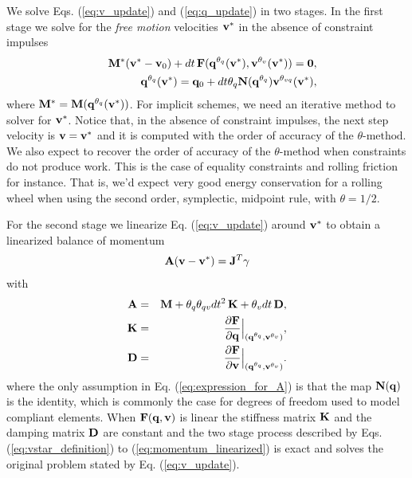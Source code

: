 We solve Eqs. (\ref{eq:v_update}) and (\ref{eq:q_update}) in two stages. In the
first stage we solve for the \textit{free motion} velocities ${\mathbf{v}}^*$ in the
absence of constraint impulses 
\begin{eqnarray}
	&&\mf{M}^*(\mf{v}^*-\mf{v}_0) + dt\,\mf{F}(\mf{q}^{\theta_q}(\mf{v}^*), \mf{v}^{\theta_v}(\mf{v}^*)) = \mf{0},
	\label{eq:vstar_definition}\\
	&&\mf{q}^{\theta_q}(\mf{v}^*) = \mf{q}_0 + dt\theta_q\mf{N}(\mf{q}^{\theta_{q}})\mf{v}^{\theta_{vq}}(\mf{v}^*),
	\label{eq:qstar_definition}
\end{eqnarray}
where ${\mathbf{M}}^* = {\mathbf{M}}({\mathbf{q}}^{\theta_q}({\mathbf{v}}^*))$.
For implicit schemes,
we need an iterative method to solver for ${\mathbf{v}}^*$. Notice that, in the
absence of constraint impulses, the next step velocity is ${\mathbf{v}}={\mathbf{v}}^*$ and
it is computed with the order of accuracy of the $\theta\text{-method}$. We also
expect to recover the order of accuracy of the $\theta\text{-method}$ when
constraints do not produce work.
This is the case of equality constraints and
rolling friction for instance. That is, we'd expect very good energy
conservation for a rolling wheel when using the second order, symplectic,
midpoint rule, with $\theta=1/2$.

For the second stage we linearize Eq. (\ref{eq:v_update})
around ${\mathbf{v}}^*$ to obtain a linearized balance of momentum
\begin{eqnarray}
	\mf{A}(\mf{v}-\mf{v}^*)= \mf{J}^T\mf{\gamma}
	\label{eq:momentum_linearized}
\end{eqnarray}
with
\begin{eqnarray}
	\mf{A}&=&\mf{M}+\theta_q\theta_{qv} dt^2\,\mf{K}+\theta_v dt\,\mf{D},
	\label{eq:expression_for_A}\\
	\mf{K}&=&\frac{\partial \mf{F}}{\partial \mf{q}}\Bigr|_{(\mf{q}^{\theta_q}, \mf{v}^{\theta_v})},\\
	\mf{D}&=&\frac{\partial \mf{F}}{\partial \mf{v}}\Bigr|_{(\mf{q}^{\theta_q},
	\mf{v}^{\theta_v})}.
	\label{eq:dissipation_matrix}
\end{eqnarray}
where the only assumption in Eq. (\ref{eq:expression_for_A}) is that the map
${\mathbf{N}}({\mathbf{q}})$ is the identity, which is commonly the case for degrees of
freedom used to model compliant elements.
When ${\mathbf{F}}({\mathbf{q}}, {\mathbf{v}})$ is
linear the stiffness matrix ${\mathbf{K}}$ and the damping matrix ${\mathbf{D}}$ are
constant and the two stage process described by Eqs. (\ref{eq:vstar_definition})
to (\ref{eq:momentum_linearized}) is exact and solves the original problem
stated by Eq. (\ref{eq:v_update}).


